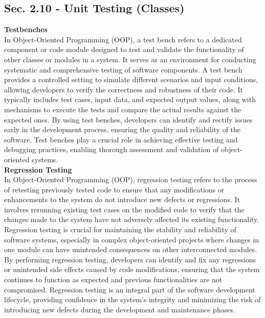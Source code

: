 \subsection{Sec. 2.10 - Unit Testing (Classes)}
\noindent \textbf{Testbenches} \\

In Object-Oriented Programming (OOP), a test bench refers to a dedicated component or code module designed to test and validate the functionality of other classes or modules in a system. It serves as an environment for conducting systematic and comprehensive 
testing of software components. A test bench provides a controlled setting to simulate different scenarios and input conditions, allowing developers to verify the correctness and robustness of their code. It typically includes test cases, input data, and expected 
output values, along with mechanisms to execute the tests and compare the actual results against the expected ones. By using test benches, developers can identify and rectify issues early in the development process, ensuring the quality and reliability of the 
software. Test benches play a crucial role in achieving effective testing and debugging practices, enabling thorough assessment and validation of object-oriented systems. \\

\noindent \textbf{Regression Testing} \\

In Object-Oriented Programming (OOP), regression testing refers to the process of retesting previously tested code to ensure that any modifications or enhancements to the system do not introduce new defects or regressions. It involves rerunning existing test cases 
on the modified code to verify that the changes made to the system have not adversely affected its existing functionality. Regression testing is crucial for maintaining the stability and reliability of software systems, especially in complex object-oriented projects 
where changes in one module can have unintended consequences on other interconnected modules. By performing regression testing, developers can identify and fix any regressions or unintended side effects caused by code modifications, ensuring that the system continues 
to function as expected and previous functionalities are not compromised. Regression testing is an integral part of the software development lifecycle, providing confidence in the system's integrity and minimizing the risk of introducing new defects during the development 
and maintenance phases. \\

